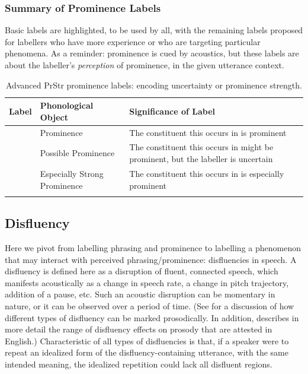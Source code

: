 \documentclass[11pt, twoside]{memoir}
\def\polar#1{{\relsize{-.5}\fontspec[Mapping=tex-text]{Roboto Mono}{#1}}}
\begin{document}
\subsubsection{Summary of Prominence Labels}\label{sec:summary-of-prominence-labels}

Basic labels are highlighted, to be used by all, with the remaining labels proposed for labellers who have more experience or who are targeting particular phenomena. As a reminder: prominence is cued by acoustics, but these labels are about the labeller’s \textit{perception} of prominence, in the given utterance context.

\begin{longtable}{clp{.5\linewidth}} \toprule \textbf{Label} & \textbf{Phonological Object} & \textbf{Significance of Label}\tabularnewline
\midrule \endhead
\rowcolor{green}
\polar{*} & Prominence & The constituent this occurs in is prominent\tabularnewline
\polar{?*} & Possible Prominence & The constituent this occurs in might be prominent, but the labeller is uncertain \tabularnewline
\polar{**} & Especially Strong Prominence & The constituent this occurs in is especially prominent \tabularnewline
\bottomrule
\caption{Advanced PrStr prominence labels: encoding uncertainty or prominence strength.}
\end{longtable}

\subsection{Disfluency}\label{sec:disfluency}

Here we pivot from labelling phrasing and prominence to labelling a phenomenon that may interact with perceived phrasing\slash prominence: disfluencies in speech. A disfluency is defined here as a disruption of fluent, connected speech, which manifests acoustically as a change in speech rate, a change in pitch trajectory, addition of a pause, etc. Such an acoustic disruption can be momentary in nature, or it can be observed over a period of time. (See \citealt{shattuck-hufnagelcutler99} for a discussion of how different types of disfluency can be marked prosodically. In addition, \citealt{brugos-19} describes in more detail the range of disfluency effects on prosody that are attested in English.) Characteristic of all types of disfluencies is that, if a speaker were to repeat an idealized form of the disfluency-containing utterance, with the same intended meaning, the idealized repetition could lack all disfluent regions.
\end{document}
